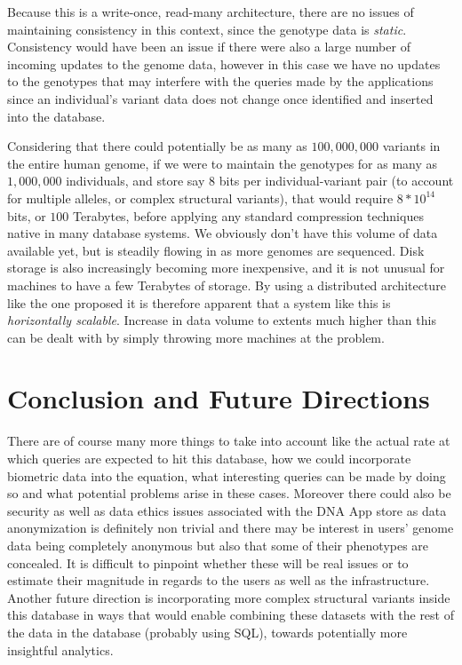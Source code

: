 \documentclass[conference,twocolumn,10pt]{IEEEtran}
\begin{document}
Because this is a write-once, read-many architecture, there are no issues of maintaining consistency in this context, since the genotype data is \textit{static}. Consistency would have been an issue if there were also a large number of incoming updates to the genome data, however in this case we have no updates to the genotypes that may interfere with the queries made by the applications since an individual’s variant data does not change once identified and inserted into the database.

Considering that there could potentially be as many as $100,000,000$ variants in the entire human genome, if we were to maintain the genotypes for as many as $1,000,000$ individuals, and store say $8$ bits per individual-variant pair (to account for multiple alleles, or complex structural variants), that would require $8*10^{14}$ bits, or $100$ Terabytes, before applying any standard compression techniques native in many database systems. We obviously don't have this volume of data available yet, but is steadily flowing in as more genomes are sequenced. Disk storage is also increasingly becoming more inexpensive, and it is not unusual for machines to have a few Terabytes of storage. By using a distributed architecture like the one proposed it is therefore apparent that a system like this is \textit{horizontally scalable}. Increase in data volume to extents much higher than this can be dealt with by simply throwing more machines at the problem.


\section{Conclusion and Future Directions}
There are of course many more things to take into account like the actual rate at which queries are expected to hit this database, how we could incorporate biometric data into the equation, what interesting queries can be made by doing so and what potential problems arise in these cases. Moreover there could also be security as well as data ethics issues associated with the DNA App store as data anonymization is definitely non trivial and there may be interest in users’ genome data being completely anonymous but also that some of their phenotypes are concealed. It is difficult to pinpoint whether these will be real issues or to estimate their magnitude in regards to the users as well as the infrastructure. Another future direction is incorporating more complex structural variants inside this database in ways that would enable combining these datasets with the rest of the data in the database (probably using SQL), towards potentially more insightful analytics.
\end{document}
